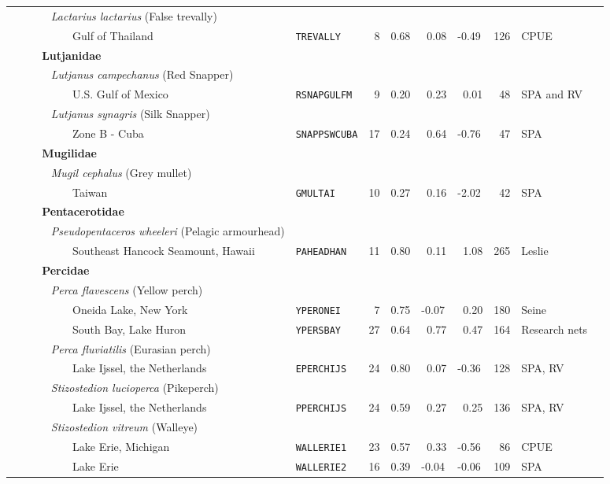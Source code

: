 \begin{flushleft}
\begin{tabular*}{7.1in}{llllllllll}
&{\it~~~~~Lactarius lactarius} (False trevally)&~&~&~&~&~&~&~  & \\ 
&~~~~~~~~~Gulf of Thailand&{\tt TREVALLY}&~8&0.68&~0.08&-0.49&126&CPUE  & \\ 
&{\bf~~~Lutjanidae}&~&~&~&~&~&~&~  & \\ 
&{\it~~~~~Lutjanus campechanus} (Red Snapper)&~&~&~&~&~&~&~  & \\ 
&~~~~~~~~~U.S. Gulf of Mexico&{\tt RSNAPGULFM}&~9&0.20&~0.23&~0.01&~48&SPA and RV  & \\ 
&{\it~~~~~Lutjanus synagris} (Silk Snapper)&~&~&~&~&~&~&~  & \\ 
&~~~~~~~~~Zone B - Cuba&{\tt SNAPPSWCUBA}&17&0.24&~0.64&-0.76&~47&SPA  & \\ 
&{\bf~~~Mugilidae}&~&~&~&~&~&~&~  & \\ 
&{\it~~~~~Mugil cephalus} (Grey mullet)&~&~&~&~&~&~&~  & \\ 
&~~~~~~~~~Taiwan&{\tt GMULTAI}&10&0.27&~0.16&-2.02&~42&SPA  & \\ 
&{\bf~~~Pentacerotidae}&~&~&~&~&~&~&~  & \\ 
&{\it~~~~~Pseudopentaceros wheeleri} (Pelagic armourhead)&~&~&~&~&~&~&~  & \\ 
&~~~~~~~~~Southeast Hancock Seamount, Hawaii&{\tt PAHEADHAN}&11&0.80&~0.11&~1.08&265&Leslie  & \\ 
&{\bf~~~Percidae}&~&~&~&~&~&~&~  & \\ 
&{\it~~~~~Perca flavescens} (Yellow perch)&~&~&~&~&~&~&~  & \\ 
&~~~~~~~~~Oneida Lake, New York&{\tt YPERONEI}&~7&0.75&-0.07&~0.20&180&Seine  & \\ 
&~~~~~~~~~South Bay, Lake Huron&{\tt YPERSBAY}&27&0.64&~0.77&~0.47&164&Research nets  & \\ 
&{\it~~~~~Perca fluviatilis} (Eurasian perch)&~&~&~&~&~&~&~  & \\ 
&~~~~~~~~~Lake Ijssel, the Netherlands&{\tt EPERCHIJS}&24&0.80&~0.07&-0.36&128&SPA, RV  & \\ 
&{\it~~~~~Stizostedion lucioperca} (Pikeperch)&~&~&~&~&~&~&~  & \\ 
&~~~~~~~~~Lake Ijssel, the Netherlands&{\tt PPERCHIJS}&24&0.59&~0.27&~0.25&136&SPA, RV  & \\ 
&{\it~~~~~Stizostedion vitreum} (Walleye)&~&~&~&~&~&~&~  & \\ 
&~~~~~~~~~Lake Erie, Michigan&{\tt WALLERIE1}&23&0.57&~0.33&-0.56&~86&CPUE  & \\ 
&~~~~~~~~~Lake Erie&{\tt WALLERIE2}&16&0.39&-0.04&-0.06&109&SPA  & \\ 

\end{tabular*}
\end{flushleft}
